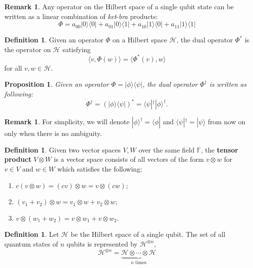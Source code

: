 \documentclass{beamer}
\theoremstyle{plain}
\newtheorem{prop}[thm]{Proposition}
\theoremstyle{definition}
\newtheorem{defn}[thm]{Definition}
\newtheorem{rem}[thm]{Remark}
\begin{document}
\begin{frame}
\begin{rem}
Any operator on the Hilbert space of a single qubit state can be written as 
a linear combination of \textit{ket}-\textit{bra} products:
	$$\Phi = a_{00}|0\rangle\langle0| + a_{01}|0\rangle\langle1| + a_{10}|1\rangle\langle0| + a_{11}|1\rangle\langle 1|$$
\end{rem}
\begin{defn}
Given an operator $\Phi$ on a Hilbert space $\mathcal H$, 
the dual operator $\Phi^*$ is the operator on $\mathcal H$ satisfying
	$$\langle v,\Phi(w)\rangle = \langle\Phi^*(v),w\rangle$$
for all $v,w\in\mathcal H$.
\end{defn}
\end{frame}

\begin{frame}
\begin{prop}
Given an operator $\Phi = |\phi\rangle\langle \psi|$, the dual operator $\Phi^\dagger$ is written as following:
	$$\Phi^\dagger = (|\phi\rangle\langle \psi|)^* = \langle\psi|^\dagger|\phi\rangle^\dagger.$$ 
\end{prop}
\begin{rem}
For simplicity, we will denote $|\phi\rangle^\dagger = \langle\phi|$ 
and $\langle\psi|^\dagger = |\psi\rangle$ from now on only when there is no ambiguity.
\end{rem}
\end{frame}

\begin{frame}
\begin{defn}
Given two vector spaces $V,W$ over the same field $\mathbb F$,
the \textbf{tensor product} $V\otimes W$ is a vector space consists of all 
vectors of the form $v\otimes w$ for $v\in V$ and $w\in W$ which satisfies the following:
\begin{enumerate}
	\item $c(v\otimes w) = (cv)\otimes w = v\otimes(cw)$;
	\item $(v_1+v_2)\otimes w = v_1\otimes w + v_2\otimes w$;
	\item $v\otimes(w_1+w_2) = v\otimes w_1 + v\otimes w_2$.
\end{enumerate}
\end{defn}
\begin{defn}
Let $\mathcal H$ be the Hilbert space of a single qubit. 
The set of all quantum states of $n$ qubits is represented by $\mathcal H^{\otimes n}$,
	$$\mathcal H^{\otimes n} = \underbrace{\mathcal H\otimes\cdots\otimes\mathcal H}_{n\textrm{ times}}$$
\end{defn}
\end{frame}
\end{document}
